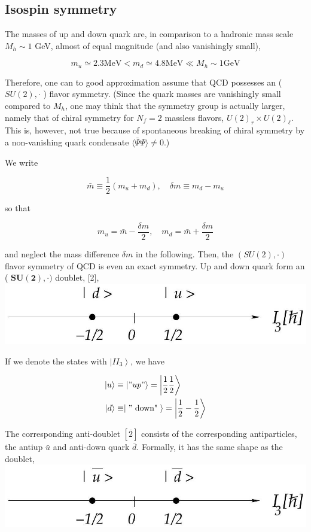 \documentclass[10pt, letterpaper]{article}
\begin{document}
\subsection{Isospin symmetry}
The masses of up and down quark are, in comparison to a hadronic mass scale $M_{h} \sim 1$ GeV, almost of equal magnitude (and also vanishingly small),

$$
m_{u} \simeq 2.3 \mathrm{MeV}<m_{d} \simeq 4.8 \mathrm{MeV} \ll M_{h} \sim 1 \mathrm{GeV}
$$

Therefore, one can to good approximation assume that QCD possesses an ( $S U(2), \cdot$ ) flavor symmetry. (Since the quark masses are vanishingly small compared to $M_{h}$, one may think that the symmetry group is actually larger, namely that of chiral symmetry for $N_{f}=2$ massless flavors, $U(2)_{r} \times U(2)_{\ell}$. This is, however, not true because of spontaneous breaking of chiral symmetry by a non-vanishing quark condensate $\langle\bar{\Psi} \Psi\rangle \neq 0$.)

We write

$$
\bar{m} \equiv \frac{1}{2}\left(m_{u}+m_{d}\right), \quad \delta m \equiv m_{d}-m_{u}
$$

so that

$$
m_{u}=\bar{m}-\frac{\delta m}{2}, \quad m_{d}=\bar{m}+\frac{\delta m}{2}
$$

and neglect the mass difference $\delta m$ in the following. Then, the $(S U(2), \cdot)$ flavor symmetry of QCD is even an exact symmetry. Up and down quark form an ( $\boldsymbol{S} \boldsymbol{U}(\mathbf{2}), \cdot)$ doublet, [2],\\
\includegraphics[scale=0.3, center]{2025_05_20_8618f55a41bfe980b4b2g-64}

If we denote the states with $\left|I I_{3}\right\rangle$, we have

$$
\begin{aligned}
|u\rangle & \equiv|" u p "\rangle=\left|\frac{1}{2} \frac{1}{2}\right\rangle \\
|d\rangle & \equiv \mid " \text { down" }\rangle=\left|\frac{1}{2}-\frac{1}{2}\right\rangle
\end{aligned}
$$

The corresponding anti-doublet $[\overline{2}]$ consists of the corresponding antiparticles, the antiup $\bar{u}$ and anti-down quark $\bar{d}$. Formally, it has the same shape as the doublet,\\
\includegraphics[scale=0.3, center]{2025_05_20_8618f55a41bfe980b4b2g-65}
\end{document}
